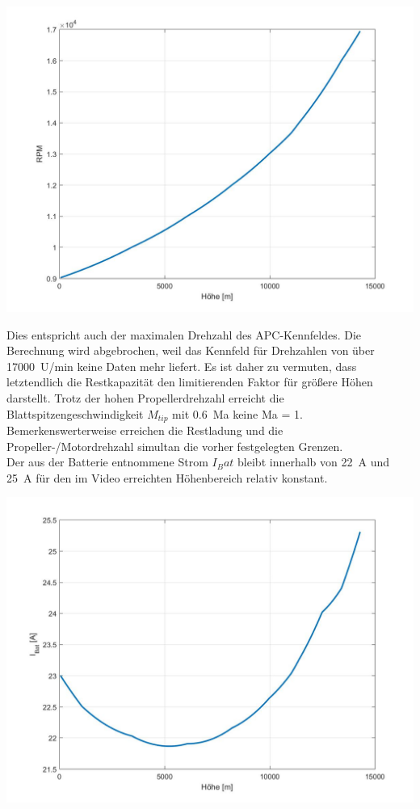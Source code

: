 \begin{center}
	\includegraphics[scale=0.3]{Diagramme/omega.jpg}
	\label{pic:omega_russland}
\end{center}
Dies entspricht auch der maximalen Drehzahl des APC-Kennfeldes. Die Berechnung wird abgebrochen, weil das Kennfeld für Drehzahlen von über \SI{17000}{U/min} keine Daten mehr liefert. Es ist daher zu vermuten, dass letztendlich die Restkapazität den limitierenden Faktor für größere Höhen  darstellt. Trotz der hohen Propellerdrehzahl erreicht die Blattspitzengeschwindigkeit \ensuremath{M_{tip}} mit \SI{0.6}{Ma} keine Ma = 1. Bemerkenswerterweise erreichen die Restladung und die Propeller-/Motordrehzahl simultan die vorher festgelegten Grenzen. \\
Der aus der Batterie entnommene Strom \ensuremath{I_Bat} bleibt innerhalb von \SI{22}{A} und \SI{25}{A} für den im Video erreichten Höhenbereich relativ konstant. 
\begin{center}
	\includegraphics[scale=0.3]{Diagramme/I_Bat.jpg}
	\label{pic:batteriestrom_russland}
\end{center}
